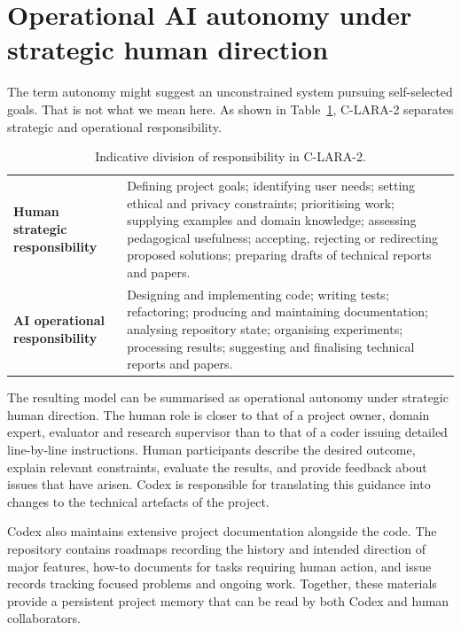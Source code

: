 \documentclass[11pt,a4paper]{article}
\begin{document}
\section{Operational AI autonomy under strategic human direction}

The term autonomy might suggest an unconstrained system pursuing self-selected goals. That is not what we mean here. As shown in Table~\ref{tab:responsibility}, C-LARA-2 separates strategic and operational responsibility.

\begin{table}[htbp]
\centering
\caption{Indicative division of responsibility in C-LARA-2.}
\label{tab:responsibility}
\begin{tabularx}{\textwidth}{@{}p{}X@{}}
\toprule
\textbf{Human strategic responsibility} & Defining project goals; identifying user needs; setting ethical and privacy constraints; prioritising work; supplying examples and domain knowledge; assessing pedagogical usefulness; accepting, rejecting or redirecting proposed solutions; preparing drafts of technical reports and papers. \\
\addlinespace
\textbf{AI operational responsibility} & Designing and implementing code; writing tests; refactoring; producing and maintaining documentation; analysing repository state; organising experiments; processing results; suggesting and finalising technical reports and papers. \\
\bottomrule
\end{tabularx}
\end{table}

The resulting model can be summarised as operational autonomy under strategic human direction. The human role is closer to that of a project owner, domain expert, evaluator and research supervisor than to that of a coder issuing detailed line-by-line instructions. Human participants describe the desired outcome, explain relevant constraints, evaluate the results, and provide feedback about issues that have arisen. Codex is responsible for translating this guidance into changes to the technical artefacts of the project.

Codex also maintains extensive project documentation alongside the code. The repository contains roadmaps recording the history and intended direction of major features, how-to documents for tasks requiring human action, and issue records tracking focused problems and ongoing work. Together, these materials provide a persistent project memory that can be read by both Codex and human collaborators.
\end{document}
